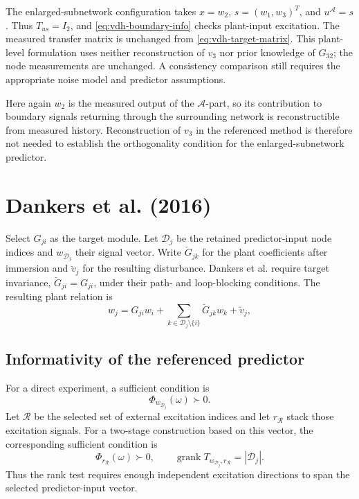 \documentclass[11pt,a4paper]{article}
\newcommand{\grank}{\operatorname{grank}}
\newcommand{\specmat}[1]{\Phi_{#1}}
\newcommand{\Aset}{\mathcal A}
\newcommand{\Dset}{\mathcal D}
\newcommand{\Rset}{\mathcal R}
\begin{document}
The enlarged-subnetwork configuration takes $x=w_2$, $s=(w_1,w_3)^T$, and $u^{\Aset}=s$.  Thus $T_{us}=I_2$, and \eqref{eq:vdh-boundary-info} checks plant-input excitation.  The measured transfer matrix is unchanged from \eqref{eq:vdh-target-matrix}.
This plant-level formulation uses neither reconstruction of $v_3$ nor prior knowledge of $G_{32}$; the node measurements are unchanged.  A consistency comparison still requires the appropriate noise model and predictor assumptions.

Here again $w_2$ is the measured output of the $\Aset$-part, so its contribution to boundary signals returning through the surrounding network is reconstructible from measured history.  Reconstruction of $v_3$ in the referenced method is therefore not needed to establish the orthogonality condition for the enlarged-subnetwork predictor.

\section{Dankers et al. (2016)}

Select $G_{ji}$ as the target module.  Let $\Dset_j$ be the retained predictor-input node indices and $w_{\Dset_j}$ their signal vector.  Write $\breve G_{jk}$ for the plant coefficients after immersion and $\breve v_j$ for the resulting disturbance.  Dankers et al. require target invariance, $\breve G_{ji}=G_{ji}$, under their path- and loop-blocking conditions.  The resulting plant relation is
\begin{equation}
  w_j
  =G_{ji}w_i
  +\sum_{k\in\Dset_j\setminus\{i\}}\breve G_{jk}w_k
  +\breve v_j,
  \label{eq:dankers-predictor}
\end{equation}

\subsection{Informativity of the referenced predictor}

For a direct experiment, a sufficient condition is
\begin{equation}
  \specmat{w_{\Dset_j}}(\omega)\succ0.
  \label{eq:dankers-direct-info}
\end{equation}
Let $\Rset$ be the selected set of external excitation indices and let $r_{\Rset}$ stack those excitation signals.  For a two-stage construction based on this vector, the corresponding sufficient condition is
\begin{equation}
  \specmat{r_{\Rset}}(\omega)\succ0,
  \qquad
  \grank T_{w_{\Dset_j},r_{\Rset}}=|\Dset_j|.
  \label{eq:dankers-twostage-info}
\end{equation}
Thus the rank test requires enough independent excitation directions to span the selected predictor-input vector.
\end{document}
